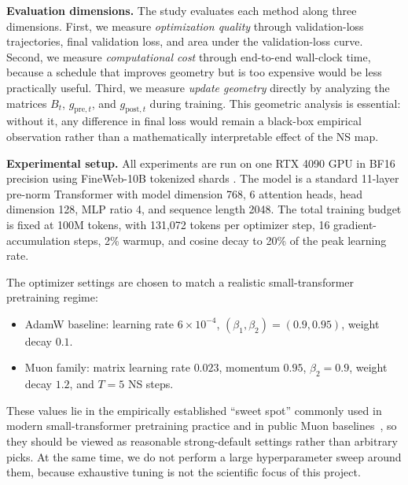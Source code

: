 \documentclass[10pt]{article}
\begin{document}
\textbf{Evaluation dimensions.}
The study evaluates each method along three dimensions. First, we measure \emph{optimization quality} through validation-loss trajectories, final validation loss, and area under the validation-loss curve. Second, we measure \emph{computational cost} through end-to-end wall-clock time, because a schedule that improves geometry but is too expensive would be less practically useful. Third, we measure \emph{update geometry} directly by analyzing the matrices $B_t$, $g_{\mathrm{pre},t}$, and $g_{\mathrm{post},t}$ during training. This geometric analysis is essential: without it, any difference in final loss would remain a black-box empirical observation rather than a mathematically interpretable effect of the NS map.

\textbf{Experimental setup.}
All experiments are run on one RTX 4090 GPU in BF16 precision using FineWeb-10B tokenized shards \citep{penedo2024fineweb}. The model is a standard 11-layer pre-norm Transformer with model dimension 768, 6 attention heads, head dimension 128, MLP ratio 4, and sequence length 2048. The total training budget is fixed at 100M tokens, with 131{,}072 tokens per optimizer step, 16 gradient-accumulation steps, 2\% warmup, and cosine decay to 20\% of the peak learning rate.

The optimizer settings are chosen to match a realistic small-transformer pretraining regime:
\begin{itemize}
    \item AdamW baseline: learning rate $6\times 10^{-4}$, $(\beta_1,\beta_2)=(0.9,0.95)$, weight decay $0.1$.
    \item Muon family: matrix learning rate $0.023$, momentum $0.95$, $\beta_2=0.9$, weight decay $1.2$, and $T=5$ NS steps.
\end{itemize}
These values lie in the empirically established ``sweet spot'' commonly used in modern small-transformer pretraining practice and in public Muon baselines~\cite{moddednanogpt2024}, so they should be viewed as reasonable strong-default settings rather than arbitrary picks. At the same time, we do not perform a large hyperparameter sweep around them, because exhaustive tuning is not the scientific focus of this project. 
\end{document}
